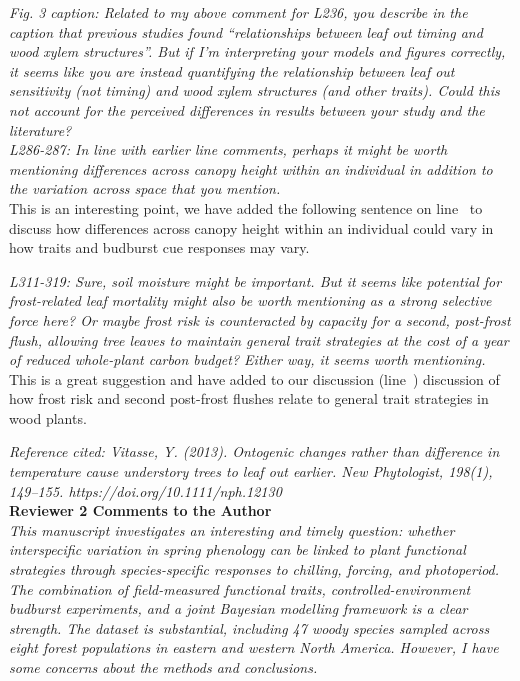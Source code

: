 \documentclass[11pt,a4paper]{article}
\newcommand{\lr}[1]{line~\lineref{#1}}
\begin{document}
\emph{Fig. 3 caption: Related to my above comment for L236, you describe in the caption that previous studies found “relationships between leaf out timing and wood xylem structures”. But if I’m interpreting your models and figures correctly, it seems like you are instead quantifying the relationship between leaf out sensitivity (not timing) and wood xylem structures (and other traits). Could this not account for the perceived differences in results between your study and the literature?}\\

\emph{L286-287: In line with earlier line comments, perhaps it might be worth mentioning differences across canopy height within an individual in addition to the variation across space that you mention.}\\

This is an interesting point, we have added the following sentence on \lr{X} to discuss how differences across canopy height within an individual could vary in how traits and budburst cue responses may vary.

\emph{L311-319: Sure, soil moisture might be important. But it seems like potential for frost-related leaf mortality might also be worth mentioning as a strong selective force here? Or maybe frost risk is counteracted by capacity for a second, post-frost flush, allowing tree leaves to maintain general trait strategies at the cost of a year of reduced whole-plant carbon budget? Either way, it seems worth mentioning.}\\

This is a great suggestion and have added to our discussion (\lr{X}) discussion of how frost risk and second post-frost flushes relate to general trait strategies in wood plants. 

\emph{Reference cited:
Vitasse, Y. (2013). Ontogenic changes rather than difference in temperature cause understory trees to leaf out earlier. New Phytologist, 198(1), 149–155. https://doi.org/10.1111/nph.12130}\\
 
\textbf{Reviewer 2 Comments to the Author}\\
 
\emph{This manuscript investigates an interesting and timely question: whether interspecific variation in spring phenology can be linked to plant functional strategies through species-specific responses to chilling, forcing, and photoperiod. The combination of field-measured functional traits, controlled-environment budburst experiments, and a joint Bayesian modelling framework is a clear strength. The dataset is substantial, including 47 woody species sampled across eight forest populations in eastern and western North America. However, I have some concerns about the methods and conclusions.}\\
\end{document}
